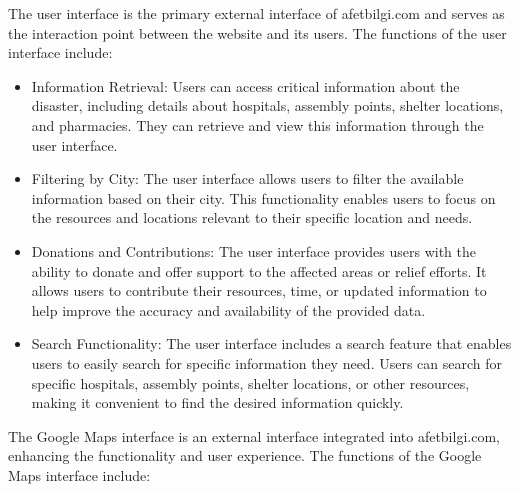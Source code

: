 \documentclass[12pt]{report}
\begin{document}
The user interface is the primary external interface of afetbilgi.com and serves as the interaction point between the website and its users. The functions of the user interface include:
\begin{itemize}
    \item Information Retrieval: Users can access critical information about the disaster, including details about hospitals, assembly points, shelter locations, and pharmacies. They can retrieve and view this information through the user interface.

    \item Filtering by City: The user interface allows users to filter the available information based on their city. This functionality enables users to focus on the resources and locations relevant to their specific location and needs.

    \item Donations and Contributions: The user interface provides users with the ability to donate and offer support to the affected areas or relief efforts. It allows users to contribute their resources, time, or updated information to help improve the accuracy and availability of the provided data.

    \item Search Functionality: The user interface includes a search feature that enables users to easily search for specific information they need. Users can search for specific hospitals, assembly points, shelter locations, or other resources, making it convenient to find the desired information quickly.
\end{itemize}

The Google Maps interface is an external interface integrated into afetbilgi.com, enhancing the functionality and user experience. The functions of the Google Maps interface include:
\end{document}
